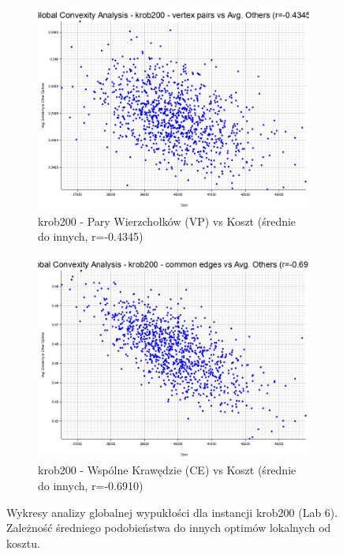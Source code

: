 \documentclass[12pt,a4paper]{article}
\begin{document}
\begin{figure}[H]
\begin{adjustwidth}{-1cm}{-1cm}
    \centering
    \begin{subfigure}[b]{0.8\textwidth}
        \centering
        \includegraphics[width=\textwidth]{output/krob200_convexity_vertex_pairs_avg_others.png}
        \caption{krob200 - Pary Wierzchołków (VP) vs Koszt (średnie do innych, r=-0.4345)}
        \label{fig:krob200_convexity_vp_avg}
    \end{subfigure}
    \hfill
    \begin{subfigure}[b]{0.8\textwidth}
        \centering
        \includegraphics[width=\textwidth]{output/krob200_convexity_common_edges_avg_others.png}
        \caption{krob200 - Wspólne Krawędzie (CE) vs Koszt (średnie do innych, r=-0.6910)}
        \label{fig:krob200_convexity_ce_avg}
    \end{subfigure}
    \caption{Wykresy analizy globalnej wypukłości dla instancji krob200 (Lab 6). Zależność średniego podobieństwa do innych optimów lokalnych od kosztu.}
    \label{fig:krob200_convexity_avg_plots}
\end{adjustwidth}
\end{figure}
\end{document}
